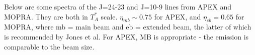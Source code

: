 Below are some spectra of the J=24-23 and J=10-9 lines from APEX and MOPRA. They are both in $T_A^*$ scale.  $\eta_{mb}\sim0.75$ for APEX, and $\eta_{eb} = 0.65$ for MOPRA, where mb = main beam and eb = extended beam, the latter of which is recommended by Jones et al.  For APEX, MB is appropriate - the emission is comparable to the beam size.